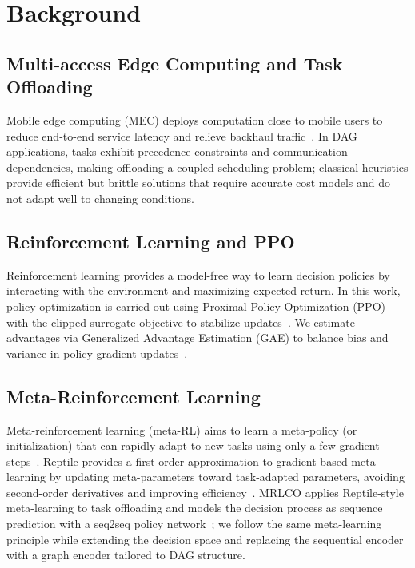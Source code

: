 \documentclass[journal,twoside]{IEEEtran}
\newcommand{\baseline}{\textsc{MRLCO}}
\begin{document}
    \section{Background}
    \label{sec:background}

\subsection{Multi-access Edge Computing and Task Offloading}
Mobile edge computing (MEC) deploys computation close to mobile users to reduce end-to-end service latency and relieve backhaul traffic~\cite{mao2017survey, kumar2013survey}. In DAG applications, tasks exhibit precedence constraints and communication dependencies, making offloading a coupled scheduling problem; classical heuristics provide efficient but brittle solutions that require accurate cost models and do not adapt well to changing conditions.

\subsection{Reinforcement Learning and PPO}
Reinforcement learning provides a model-free way to learn decision policies by interacting with the environment and maximizing expected return. In this work, policy optimization is carried out using Proximal Policy Optimization (PPO) with the clipped surrogate objective to stabilize updates~\cite{schulman2017proximal}. We estimate advantages via Generalized Advantage Estimation (GAE) to balance bias and variance in policy gradient updates~\cite{schulman2016gae}.

\subsection{Meta-Reinforcement Learning}
Meta-reinforcement learning (meta-RL) aims to learn a meta-policy (or initialization) that can rapidly adapt to new tasks using only a few gradient steps~\cite{finn2017model}. Reptile provides a first-order approximation to gradient-based meta-learning by updating meta-parameters toward task-adapted parameters, avoiding second-order derivatives and improving efficiency~\cite{nichol2018reptile}. \baseline{} applies Reptile-style meta-learning to task offloading and models the decision process as sequence prediction with a seq2seq policy network~\cite{wang2020fast}; we follow the same meta-learning principle while extending the decision space and replacing the sequential encoder with a graph encoder tailored to DAG structure.
\end{document}
